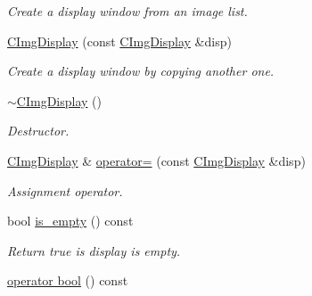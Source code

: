 \begin{DoxyCompactItemize}
\begin{DoxyCompactList}\small\item\em Create a display window from an image list. \end{DoxyCompactList}\item 
\hyperlink{structcimg__library_1_1_c_img_display_ad4267bd4ac382369ba69af62eb110794}{C\-Img\-Display} (const \hyperlink{structcimg__library_1_1_c_img_display}{C\-Img\-Display} \&disp)
\begin{DoxyCompactList}\small\item\em Create a display window by copying another one. \end{DoxyCompactList}\item 
\hypertarget{structcimg__library_1_1_c_img_display_ac74bd2dc3ff700966eae996505e63080}{\hyperlink{structcimg__library_1_1_c_img_display_ac74bd2dc3ff700966eae996505e63080}{$\sim$\-C\-Img\-Display} ()}\label{structcimg__library_1_1_c_img_display_ac74bd2dc3ff700966eae996505e63080}

\begin{DoxyCompactList}\small\item\em Destructor. \end{DoxyCompactList}\item 
\hypertarget{structcimg__library_1_1_c_img_display_a4f6a068b54eab95307a8c6fa0fcc6ba3}{\hyperlink{structcimg__library_1_1_c_img_display}{C\-Img\-Display} \& \hyperlink{structcimg__library_1_1_c_img_display_a4f6a068b54eab95307a8c6fa0fcc6ba3}{operator=} (const \hyperlink{structcimg__library_1_1_c_img_display}{C\-Img\-Display} \&disp)}\label{structcimg__library_1_1_c_img_display_a4f6a068b54eab95307a8c6fa0fcc6ba3}

\begin{DoxyCompactList}\small\item\em Assignment operator. \end{DoxyCompactList}\item 
\hypertarget{structcimg__library_1_1_c_img_display_abcb1bc6553073e87afff614bcad7aa0d}{bool \hyperlink{structcimg__library_1_1_c_img_display_abcb1bc6553073e87afff614bcad7aa0d}{is\-\_\-empty} () const }\label{structcimg__library_1_1_c_img_display_abcb1bc6553073e87afff614bcad7aa0d}

\begin{DoxyCompactList}\small\item\em Return true is display is empty. \end{DoxyCompactList}\item 
\hypertarget{structcimg__library_1_1_c_img_display_a609820efa14d85e4f07bcde9760fc5b3}{\hyperlink{structcimg__library_1_1_c_img_display_a609820efa14d85e4f07bcde9760fc5b3}{operator bool} () const }\label{structcimg__library_1_1_c_img_display_a609820efa14d85e4f07bcde9760fc5b3}


\end{DoxyCompactItemize}
